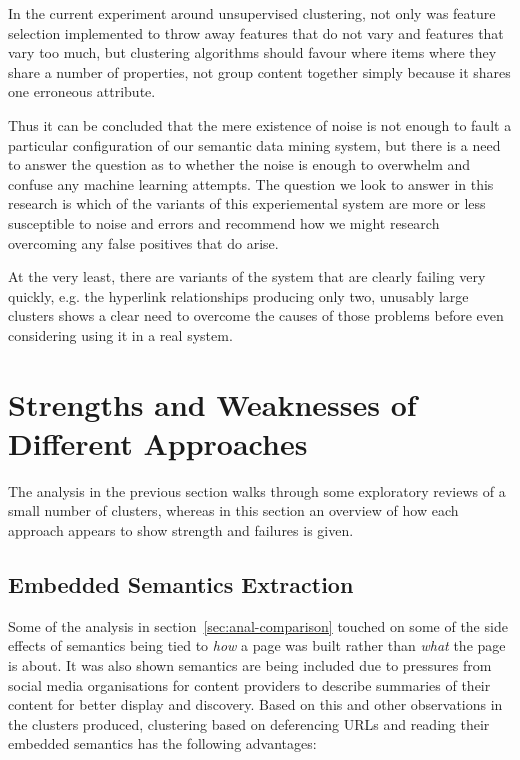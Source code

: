 In the current experiment around unsupervised clustering, not only
was feature selection implemented to throw away features that do not
vary and features that vary too much, but clustering algorithms
should favour where items where they share a number of properties, not
group content together simply because it shares one erroneous
attribute.

Thus it can be concluded that the mere existence of noise is not
enough to fault a particular configuration of our semantic data mining
system, but there is a need to answer the question as to whether the
noise is enough to overwhelm and confuse any machine learning
attempts. The question we look to answer in this research is which
of the variants of this experiemental system are more or less
susceptible to noise and errors and recommend how we might research
overcoming any false positives that do arise.

At the very least, there are variants of the system that are clearly
failing very quickly, e.g. the hyperlink relationships producing only
two, unusably large clusters shows a clear need to overcome the causes
of those problems before even considering using it in a real system.

\section{Strengths and Weaknesses of Different Approaches}

The analysis in the previous section walks through some exploratory
reviews of a small number of clusters, whereas in this section an
overview of how each approach appears to show strength and failures
is given.

\subsection{Embedded Semantics Extraction}
\label{sec:anal-deref}

Some of the analysis in section~\ref{sec:anal-comparison} touched on
some of the side effects of semantics being tied to \emph{how} a page
was built rather than \emph{what} the page is about. It was also
shown semantics are being included due to  pressures from social media
organisations for content
providers to describe summaries of their content for better display
and discovery. Based on this and other observations in the clusters
produced, clustering based on deferencing URLs and reading their
embedded semantics has the following advantages:

